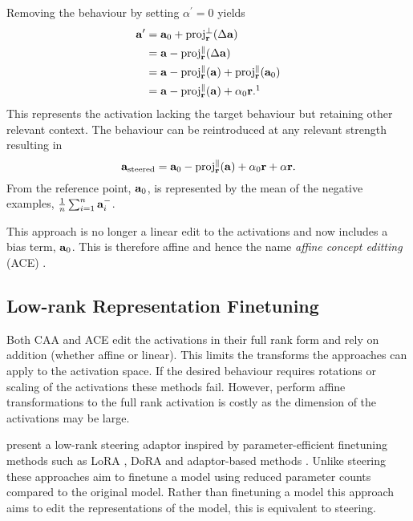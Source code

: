 Removing the behaviour by setting $\alpha^\prime = 0$ yields
\begin{align*}
    \va^\prime &= \va_0 + \text{proj}_\vr^{\perp}(\Delta\va) \\
               &= \va - \text{proj}_\vr^{\parallel}(\Delta\va) \\
               &= \va - \text{proj}_\vr^{\parallel}(\va) + \text{proj}_\vr^{\parallel}(\va_0) \\
               &= \va - \text{proj}_\vr^{\parallel}(\va) + \alpha_0\vr.\footnotemark[1]
\end{align*}
This represents the activation lacking the target behaviour but retaining other relevant context.
The behaviour can be reintroduced at any relevant strength resulting in
\begin{equation}
    \label{eq:ace}
    \mathbf{a}_\text{steered} = \mathbf{a}_0 - \text{proj}_{\mathbf{r}}^{\parallel}(\mathbf{a}) + \alpha_0\mathbf{r} + \alpha\mathbf{r}.
\end{equation}
From  the reference point, $\mathbf{a}_0$, is represented by the mean of the negative examples, $\frac{1}{n}\sum_{i=1}^{n}\mathbf{a}_i^-$.

This approach is no longer a linear edit to the activations and now includes a bias term, $\mathbf{a}_0$.
This is therefore affine and hence the name \textit{affine concept editting} (ACE) \cite{ace}.

\subsection{Low-rank Representation Finetuning}
\label{loreft}

Both CAA \cite{caa} and ACE \cite{ace} edit the activations in their full rank form and rely on addition (whether affine or linear).
This limits the transforms the approaches can apply to the activation space.
If the desired behaviour requires rotations or scaling of the activations these methods fail.
However, perform affine transformations to the full rank activation is costly as the dimension of the activations may be large.

\citet{reft} present a low-rank steering adaptor inspired by parameter-efficient finetuning methods such as LoRA \cite{lora}, DoRA \cite{dora} and adaptor-based methods \cite{petl}.
Unlike steering these approaches aim to finetune a model using reduced parameter counts compared to the original model.
Rather than finetuning a model this approach aims to edit the representations of the model, this is equivalent to steering.

